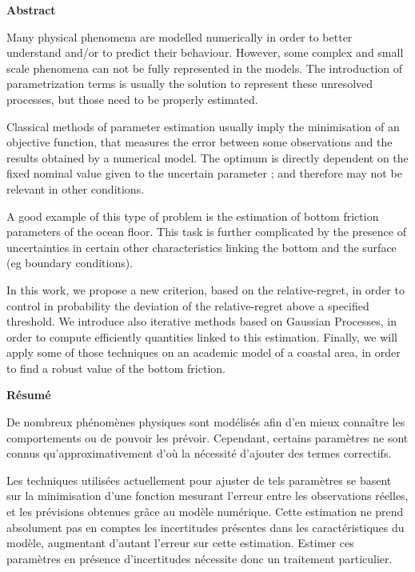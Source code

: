 \pagestyle{empty}


\small
\begin{center}
  \bf Abstract
\end{center}
\vspace{0.5cm}
Many physical phenomena are modelled numerically in
order to better understand and/or to predict their behaviour. However,
some complex and small scale phenomena can not be fully represented in
the models. The introduction of parametrization terms is usually the
solution to represent these unresolved processes, but those need to be
properly estimated.

Classical methods of parameter estimation usually imply the minimisation of an objective function, that measures the error between some observations and the results obtained by a numerical model. The optimum is directly dependent on the fixed nominal value given to the uncertain parameter ; and therefore may not be relevant in other conditions. 

 A good example of this type of problem is the estimation of bottom friction parameters of the ocean floor. This task is further complicated by the presence of uncertainties in certain other characteristics linking the bottom and the surface (eg boundary conditions).

In this work, we propose a new criterion, based on the relative-regret, in order to control in probability the deviation of the relative-regret above a specified threshold. We introduce also iterative methods based on Gaussian Processes, in order to compute efficiently quantities linked to this estimation.
Finally, we will apply some of those techniques on an academic model of a coastal area, in order to find a robust value of the bottom friction.

\vspace{1cm}
\etoile
\vspace{1cm}

\begin{center}
  \bf Résumé
\end{center}
\vspace{0.5cm}
De nombreux phénomènes physiques sont modélisés afin d'en mieux connaître les comportements ou de pouvoir les prévoir. Cependant, certains paramètres ne sont connus qu'ap\-proxi\-mati\-vement d'où la nécessité d'ajouter des termes correctifs. 

Les techniques utilisées actuellement pour ajuster de tels paramètres se basent sur la minimisation d'une fonction mesurant l'erreur entre les observations réelles, et les prévisions obtenues grâce au modèle numérique. Cette estimation ne prend absolument pas en comptes les incertitudes présentes dans les caractéristiques du modèle, augmentant d'autant l'erreur sur cette estimation. Estimer ces paramètres en présence d'incertitudes nécessite donc un traitement particulier.

